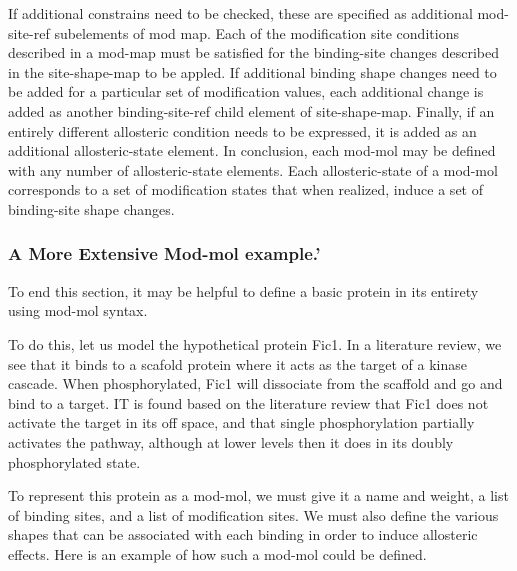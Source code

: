 If additional constrains need to be checked, these are specified as
additional mod-site-ref subelements of mod map.  Each of the
modification site conditions described in a mod-map must be satisfied
for the binding-site changes described in the site-shape-map to be
appled.  If additional binding shape changes need to be added for a
particular set of modification values, each additional change is added
as another binding-site-ref child element of site-shape-map.  Finally,
if an entirely different allosteric condition needs to be expressed,
it is added as an additional allosteric-state element.  In conclusion,
each mod-mol may be defined with any number of allosteric-state
elements.  Each allosteric-state of a mod-mol corresponds to a set of
modification states that when realized, induce a set of binding-site
shape changes.

\subsubsection{A More Extensive Mod-mol example.'}

To end this section, it may be helpful to define a basic protein in
its entirety using mod-mol syntax.

To do this, let us model the hypothetical protein Fic1.  In a
literature review, we see that it binds to a scafold protein where it
acts as the target of a kinase cascade.  When phosphorylated, Fic1
will dissociate from the scaffold and go and bind to a target.  IT is
found based on the literature review that Fic1 does not activate the
target in its off space, and that single phosphorylation partially
activates the pathway, although at lower levels then it does in its
doubly phosphorylated state.  

To represent this protein as a mod-mol, we must give it a name and
weight, a list of binding sites, and a list of modification sites.  We
must also define the various shapes that can be associated with each
binding in order to induce allosteric effects.  Here is an example of
how such a mod-mol could be defined.

